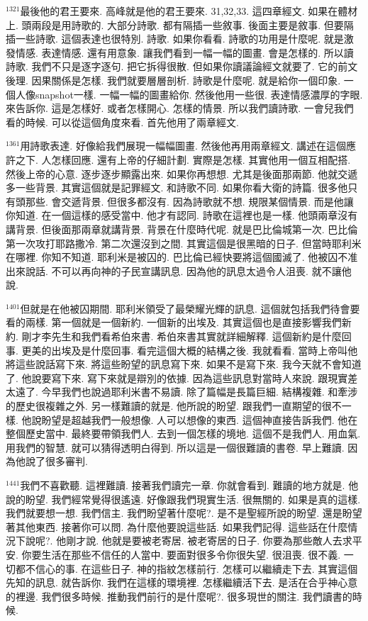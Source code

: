 \documentclass{book}
\begin{document}
$^{1321}$最後他的君王要來.
高峰就是他的君王要來.
31,32,33.
這四章經文.
如果在體材上.
頭兩段是用詩歌的.
大部分詩歌.
都有隔插一些敘事.
後面主要是敘事.
但要隔插一些詩歌.
這個表達也很特別.
詩歌.
如果你看看.
詩歌的功用是什麼呢.
就是激發情感.
表達情感.
還有用意象.
讓我們看到一幅一幅的圖畫.
會是怎樣的.
所以讀詩歌.
我們不只是逐字逐句.
把它拆得很散.
但如果你讀議論經文就要了.
它的前文後理.
因果關係是怎樣.
我們就要層層剖析.
詩歌是什麼呢.
就是給你一個印象.
一個人像snapshot一樣.
一幅一幅的圖畫給你.
然後他用一些很.
表達情感濃厚的字眼.
來告訴你.
這是怎樣好.
或者怎樣開心.
怎樣的情景.
所以我們讀詩歌.
一會兒我們看的時候.
可以從這個角度來看.
首先他用了兩章經文.

$^{1361}$用詩歌表達.
好像給我們展現一幅幅圖畫.
然後他再用兩章經文.
講述在這個應許之下.
人怎樣回應.
還有上帝的仔細計劃.
實際是怎樣.
其實他用一個互相配搭.
然後上帝的心意.
逐步逐步顯露出來.
如果你再想想.
尤其是後面那兩節.
他就交遞多一些背景.
其實這個就是記罪經文.
和詩歌不同.
如果你看大衛的詩篇.
很多他只有頭那些.
會交遞背景.
但很多都沒有.
因為詩歌就不想.
規限某個情景.
而是他讓你知道.
在一個這樣的感受當中.
他才有認同.
詩歌在這裡也是一樣.
他頭兩章沒有講背景.
但後面那兩章就講背景.
背景在什麼時代呢.
就是巴比倫城第一次.
巴比倫第一次攻打耶路撒冷.
第二次還沒到之間.
其實這個是很黑暗的日子.
但當時耶利米在哪裡.
你知不知道.
耶利米是被囚的.
巴比倫已經快要將這個國滅了.
他被囚不准出來說話.
不可以再向神的子民宣講訊息.
因為他的訊息太過令人沮喪.
就不讓他說.

$^{1401}$但就是在他被囚期間.
耶利米領受了最榮耀光輝的訊息.
這個就包括我們待會要看的兩樣.
第一個就是一個新約.
一個新的出埃及.
其實這個也是直接影響我們新約.
剛才李先生和我們看希伯來書.
希伯來書其實就詳細解釋.
這個新約是什麼回事.
更美的出埃及是什麼回事.
看完這個大概的結構之後.
我就看看.
當時上帝叫他將這些說話寫下來.
將這些盼望的訊息寫下來.
如果不是寫下來.
我今天就不會知道了.
他說要寫下來.
寫下來就是辯別的依據.
因為這些訊息對當時人來說.
跟現實差太遠了.
今早我們也說過耶利米書不易讀.
除了篇幅是長篇巨細.
結構複雜.
和牽涉的歷史很複雜之外.
另一樣難讀的就是.
他所說的盼望.
跟我們一直期望的很不一樣.
他說盼望是超越我們一般想像.
人可以想像的東西.
這個神直接告訴我們.
他在整個歷史當中.
最終要帶領我們人.
去到一個怎樣的境地.
這個不是我們人.
用血氣.
用我們的智慧.
就可以猜得透明白得到.
所以這是一個很難讀的書卷.
早上難讀.
因為他說了很多審判.

$^{1441}$我們不喜歡聽.
這裡難讀.
接著我們讀完一章.
你就會看到.
難讀的地方就是.
他說的盼望.
我們經常覺得很遙遠.
好像跟我們現實生活.
很無關的.
如果是真的這樣.
我們就要想一想.
我們信主.
我們盼望著什麼呢?.
是不是聖經所說的盼望.
還是盼望著其他東西.
接著你可以問.
為什麼他要說這些話.
如果我們記得.
這些話在什麼情況下說呢?.
他剛才說.
他就是要被老寄居.
被老寄居的日子.
你要為那些敵人去求平安.
你要生活在那些不信任的人當中.
要面對很多令你很失望.
很沮喪.
很不義.
一切都不信心的事.
在這些日子.
神的指紋怎樣前行.
怎樣可以繼續走下去.
其實這個先知的訊息.
就告訴你.
我們在這樣的環境裡.
怎樣繼續活下去.
是活在合乎神心意的裡邊.
我們很多時候.
推動我們前行的是什麼呢?.
很多現世的關注.
我們讀書的時候.
\end{document}
